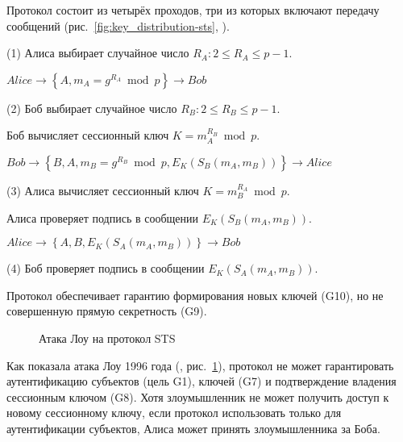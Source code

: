 Протокол состоит из четырёх проходов, три из которых включают передачу сообщений (рис.~\ref{fig:key_distribution-sts}, \cite{Cheremushkin:2009}).

\begin{protocol}
    \item[(1)] Алиса выбирает случайное число $R_A: 2 \leq R_A \leq p-1$.
    \item[{}] $Alice \to \left\{ A, m_A = g^{R_A} \bmod p \right\} \to Bob$

    \item[(2)] Боб выбирает случайное число $R_B: 2 \leq R_B \leq p-1$.
    \item[{}] Боб вычисляет сессионный ключ $K = m_A^{R_B} \bmod p$.
    \item[{}] $Bob \to \left\{ B, A, m_B = g^{R_B} \bmod p, E_K( S_B ( m_A, m_B )) \right\} \to Alice$

    \item[(3)] Алиса вычисляет сессионный ключ $K = m_B^{R_A} \bmod p$.
    \item[{}] Алиса проверяет подпись в сообщении $E_K( S_B ( m_A, m_B ))$.
    \item[{}] $Alice \to \left\{ A, B, E_K( S_A ( m_A, m_B ) ) \right\} \to Bob$

    \item[(4)] Боб проверяет подпись в сообщении $E_K( S_A ( m_A, m_B ))$.
\end{protocol}

Протокол обеспечивает гарантию формирования новых ключей (G10), но не совершенную прямую секретность (G9).

\begin{figure}
	\centering
	\begin{sequencediagram}
		
	\end{sequencediagram}
	\caption{Атака Лоу на протокол STS\label{fig:key_distribution-sts-attack}}
\end{figure}

Как показала атака Лоу 1996 года (\cite{Lowe:1996}, рис.~\ref{fig:key_distribution-sts-attack}), протокол не может гарантировать аутентификацию субъектов (цель G1), ключей (G7) и подтверждение владения сессионным ключом (G8). Хотя злоумышленник не может получить доступ к новому сессионному ключу, если протокол использовать только для аутентификации субъектов, Алиса может принять злоумышленника за Боба.

